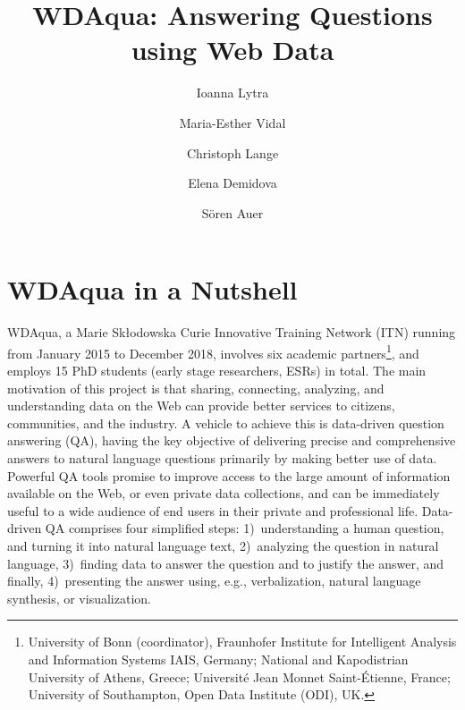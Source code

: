 \documentclass[a4paper]{llncs}
\begin{document}
	
	\mainmatter
	\title{WDAqua: Answering Questions using Web Data}
	
	\author{Ioanna Lytra
          \and Maria-Esther Vidal
          \and Christoph Lange
          \and Elena Demidova
          \and S{\"o}ren Auer}
	
	\maketitle
	
	\section{WDAqua in a Nutshell} \label{sec:intro}
	WDAqua, a Marie Sk{\l}odowska Curie Innovative Training Network (ITN) running from January 2015 to December 2018, involves six academic partners\footnote{University of Bonn (coordinator), Fraunhofer Institute for Intelligent Analysis and Information Systems IAIS, Germany; National and Kapodistrian University of Athens, Greece; Universit{\'e} Jean Monnet Saint-{\'E}tienne, France; University of Southampton, Open Data Institute (ODI), UK.}, and employs 15 PhD students (early stage researchers, ESRs) in total.
        The main motivation of this project is that sharing, connecting, analyzing, and understanding data on the Web can provide better services to citizens, communities, and the industry.
        A vehicle to achieve this is data-driven question answering (QA), having the key objective of delivering precise and comprehensive answers to natural language questions primarily by making better use of data.
        Powerful QA tools promise to improve access to the large amount of information available on the Web, or even private data collections, and can be immediately useful to a wide audience of end users in their private and professional life.
        Data-driven QA comprises four simplified steps: 1)~understanding a human question, and turning it into natural language text, 2)~analyzing the question in natural language, 3)~finding data to answer the question and to justify the answer, and finally, 4)~presenting the answer using, e.g., verbalization, natural language synthesis, or visualization.
	
\end{document}
